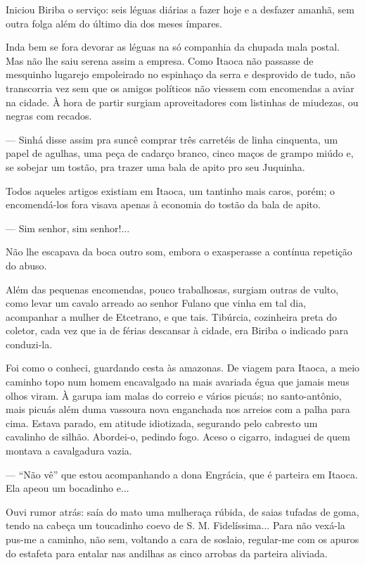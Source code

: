 Iniciou Biriba o serviço: seis léguas diárias a fazer hoje e a desfazer
amanhã, sem outra folga além do último dia dos meses ímpares.

Inda bem se fora devorar as léguas na só companhia da chupada mala
postal. Mas não lhe saiu serena assim a empresa. Como Itaoca não
passasse de mesquinho lugarejo empoleirado no espinhaço da serra e
desprovido de tudo, não transcorria vez sem que os amigos políticos não
viessem com encomendas a aviar na cidade. À hora de partir surgiam
aproveitadores com listinhas de miudezas, ou negras com recados.

--- Sinhá disse assim pra suncê comprar três carretéis de linha
cinquenta, um papel de agulhas, uma peça de cadarço branco, cinco maços
de grampo miúdo e, se sobejar um tostão, pra trazer uma bala de apito
pro seu Juquinha.

Todos aqueles artigos existiam em Itaoca, um tantinho mais caros, porém;
o encomendá-los fora visava apenas à economia do tostão da bala de
apito.

--- Sim senhor, sim senhor!...

Não lhe escapava da boca outro som, embora o exasperasse a contínua
repetição do abuso.

Além das pequenas encomendas, pouco trabalhosas, surgiam outras de
vulto, como levar um cavalo arreado ao senhor Fulano que vinha em tal
dia, acompanhar a mulher de Etcetrano, e que tais. Tibúrcia, cozinheira
preta do coletor, cada vez que ia de férias descansar à cidade, era
Biriba o indicado para conduzi-la.

Foi como o conheci, guardando cesta às amazonas. De viagem para Itaoca,
a meio caminho topo num homem encavalgado na mais avariada égua que
jamais meus olhos viram. À garupa iam malas do correio e vários picuás;
no santo-antônio, mais picuás além duma vassoura nova enganchada nos
arreios com a palha para cima. Estava parado, em atitude idiotizada,
segurando pelo cabresto um cavalinho de silhão. Abordei-o, pedindo fogo.
Aceso o cigarro, indaguei de quem montava a cavalgadura vazia.

--- ``Não vê'' que estou acompanhando a dona Engrácia, que é parteira em
Itaoca. Ela apeou um bocadinho e...

Ouvi rumor atrás: saía do mato uma mulheraça rúbida, de saias tufadas de
goma, tendo na cabeça um toucadinho coevo de S. M. Fidelíssima... Para
não vexá-la pus-me a caminho, não sem, voltando a cara de soslaio,
regular-me com os apuros do estafeta para entalar nas andilhas as cinco
arrobas da parteira aliviada.

